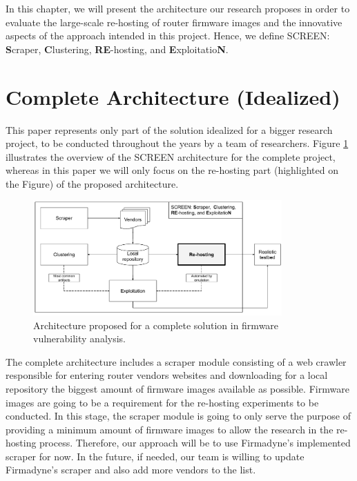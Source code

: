 In this chapter, we will present the architecture our research proposes in order to evaluate the large-scale re-hosting of router firmware images and the innovative aspects of the approach intended in this project. Hence, we define SCREEN: {\bf S}craper, {\bf C}lustering, {\bf RE}-hosting, and {\bf E}xploitatio{\bf N}.

\section{Complete Architecture (Idealized)}
This paper represents only part of the solution idealized for a bigger research project, to be conducted throughout the years by a team of researchers. Figure \ref{fig:architecture} illustrates the overview of the SCREEN architecture for the complete project, whereas in this paper we will only focus on the re-hosting part (highlighted on the Figure) of the proposed architecture.

\begin{figure}[h]
    \centering
    \includegraphics[width=0.85\textwidth]{figs/screen.pdf}
    \caption{Architecture proposed for a complete solution in firmware vulnerability analysis.}
    \label{fig:architecture}
\end{figure}

The complete architecture includes a scraper module consisting of a web crawler responsible for entering router vendors websites and downloading for a local repository the biggest amount of firmware images available as possible. Firmware images are going to be a requirement for the re-hosting experiments to be conducted. In this stage, the scraper module is going to only serve the purpose of providing a minimum amount of firmware images to allow the research in the re-hosting process. Therefore, our approach will be to use Firmadyne's \cite{firmadyne} implemented scraper for now. In the future, if needed, our team is willing to update Firmadyne's \cite{firmadyne} scraper and also add more vendors to the list.

